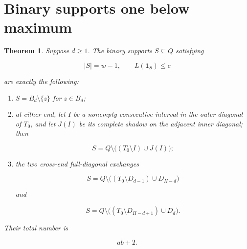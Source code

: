 \documentclass[11pt]{article}
\newtheorem{theorem}{Theorem}[section]
\numberwithin{equation}{section}
\begin{document}
\section{Binary supports one below maximum}


\Needspace{0.25\textheight}
\begin{theorem}

Suppose $d\ge1$. The binary supports $S\subseteq Q$ satisfying

\nopagebreak[4]
\[
|S|=w-1,\qquad L(\mathbf1_S)\le c
\]

are exactly the following:

\begin{enumerate}
\item $S=B_d\setminus\{z\}$ for $z\in B_d$;
\item at either end, let $I$ be a nonempty consecutive interval in the outer
diagonal of $T_0$, and let $J(I)$ be its complete shadow on the adjacent
inner diagonal; then

\nopagebreak[4]
\[
S=Q\setminus\bigl((T_0\setminus I)\cup J(I)\bigr);
\]

\item the two cross-end full-diagonal exchanges

\nopagebreak[4]
\[
S=Q\setminus\bigl((T_0\setminus D_{d-1})\cup D_{H-d}\bigr)
\]

and

\nopagebreak[4]
\[
S=Q\setminus\bigl((T_0\setminus D_{H-d+1})\cup D_d\bigr).
\]

\end{enumerate}

Their total number is

\nopagebreak[4]
\[
ab+2.
\tag{5.1}
\]

\end{theorem}
\end{document}
